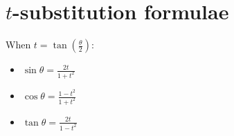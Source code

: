 \section{$t$-substitution formulae}
When $t=\tan\left(\frac{\theta}{2}\right)$:
\begin{itemize}
    \item $\sin\theta = \frac{2t}{1+t^2}$
    \item $\cos\theta = \frac{1-t^2}{1+t^2}$
    \item $\tan\theta = \frac{2t}{1-t^2}$
\end{itemize}